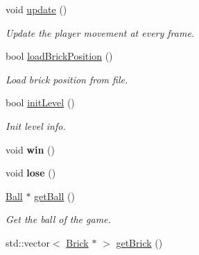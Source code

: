 \begin{DoxyCompactItemize}
\mbox{\label{class_game_setting_af288c0e3da3cc39e130dea17e81b79e4}} 
void \mbox{\hyperlink{class_game_setting_af288c0e3da3cc39e130dea17e81b79e4}{update}} ()
\begin{DoxyCompactList}\small\item\em Update the player movement at every frame. \end{DoxyCompactList}\item 
\mbox{\label{class_game_setting_a40bffab6620bebb83cd00fe999233c9f}} 
bool \mbox{\hyperlink{class_game_setting_a40bffab6620bebb83cd00fe999233c9f}{load\+Brick\+Position}} ()
\begin{DoxyCompactList}\small\item\em Load brick position from file. \end{DoxyCompactList}\item 
\mbox{\label{class_game_setting_a257a0a8e6afd3344ec24905004cb6159}} 
bool \mbox{\hyperlink{class_game_setting_a257a0a8e6afd3344ec24905004cb6159}{init\+Level}} ()
\begin{DoxyCompactList}\small\item\em Init level info. \end{DoxyCompactList}\item 
\mbox{\label{class_game_setting_a72eb7a75dac612c6356c540422b3b8d8}} 
void {\bfseries win} ()
\item 
\mbox{\label{class_game_setting_aa27958b8bec29dd01ffd32b935f477a6}} 
void {\bfseries lose} ()
\item 
\mbox{\label{class_game_setting_aac0af4736d5b34eb22d69a457a58eab9}} 
\mbox{\hyperlink{class_ball}{Ball}} $\ast$ \mbox{\hyperlink{class_game_setting_aac0af4736d5b34eb22d69a457a58eab9}{get\+Ball}} ()
\begin{DoxyCompactList}\small\item\em Get the ball of the game. \end{DoxyCompactList}\item 
\mbox{\label{class_game_setting_a590841453549ee4eab8afa4c2c9de275}} 
std\+::vector$<$ \mbox{\hyperlink{class_brick}{Brick}} $\ast$ $>$ \mbox{\hyperlink{class_game_setting_a590841453549ee4eab8afa4c2c9de275}{get\+Brick}} ()

\end{DoxyCompactItemize}
